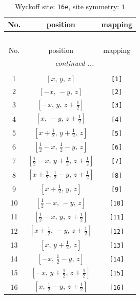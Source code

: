 \documentclass[fleqn,8pt]{jsarticle}
\begin{document}
\begin{longtable}{ccc}
\caption{Wyckoff site: {\tt 16e}, site symmetry: {\tt 1}}
 \\
 \hline \hline
No. & position & mapping \\ \hline \endfirsthead

\multicolumn{2}{l}{\tablename\ \thetable{}} \\
 \hline \hline
No. & position & mapping \\ \hline \endhead

 \hline \hline
\multicolumn{2}{r}{\footnotesize\it continued ...} \\ \endfoot

 \hline \hline
\multicolumn{2}{r}{} \\ \endlastfoot

1 & $\left[ x,\, y,\, z \right]$ & {\tt [1]} \\ \hline
2 & $\left[ - x,\, - y,\, z \right]$ & {\tt [2]} \\ \hline
3 & $\left[ - x,\, y,\, z + \frac{1}{2} \right]$ & {\tt [3]} \\ \hline
4 & $\left[ x,\, - y,\, z + \frac{1}{2} \right]$ & {\tt [4]} \\ \hline
5 & $\left[ x + \frac{1}{2},\, y + \frac{1}{2},\, z \right]$ & {\tt [5]} \\ \hline
6 & $\left[ \frac{1}{2} - x,\, \frac{1}{2} - y,\, z \right]$ & {\tt [6]} \\ \hline
7 & $\left[ \frac{1}{2} - x,\, y + \frac{1}{2},\, z + \frac{1}{2} \right]$ & {\tt [7]} \\ \hline
8 & $\left[ x + \frac{1}{2},\, \frac{1}{2} - y,\, z + \frac{1}{2} \right]$ & {\tt [8]} \\ \hline
9 & $\left[ x + \frac{1}{2},\, y,\, z \right]$ & {\tt [9]} \\ \hline
10 & $\left[ \frac{1}{2} - x,\, - y,\, z \right]$ & {\tt [10]} \\ \hline
11 & $\left[ \frac{1}{2} - x,\, y,\, z + \frac{1}{2} \right]$ & {\tt [11]} \\ \hline
12 & $\left[ x + \frac{1}{2},\, - y,\, z + \frac{1}{2} \right]$ & {\tt [12]} \\ \hline
13 & $\left[ x,\, y + \frac{1}{2},\, z \right]$ & {\tt [13]} \\ \hline
14 & $\left[ - x,\, \frac{1}{2} - y,\, z \right]$ & {\tt [14]} \\ \hline
15 & $\left[ - x,\, y + \frac{1}{2},\, z + \frac{1}{2} \right]$ & {\tt [15]} \\ \hline
16 & $\left[ x,\, \frac{1}{2} - y,\, z + \frac{1}{2} \right]$ & {\tt [16]} \\
\end{longtable}
\end{document}
